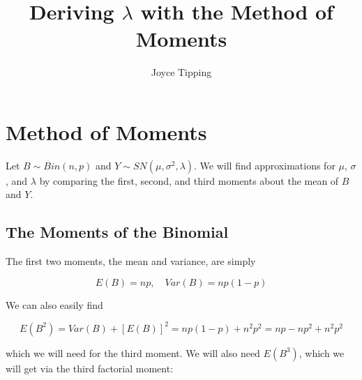 \documentclass{article}
\begin{document}
\title {Deriving $\lambda$ with the Method of Moments}
\author {Joyce Tipping}
\date{}
\maketitle

\section{Method of Moments}

Let $B \sim Bin(n, p)$ and $Y \sim SN(\mu, \sigma^2, \lambda)$. We will find
approximations for $\mu$, $\sigma$, and $\lambda$ by comparing the first,
second, and third moments about the mean of $B$ and $Y$.

\subsection{The Moments of the Binomial}

The first two moments, the mean and variance, are simply

\begin{equation*}
  E(B) = np, \quad Var(B) = np(1-p)
\end{equation*}

We can also easily find

\begin{equation*}
  E(B^2) = Var(B) + [E(B)]^2 = np(1-p) + n^2p^2 = np - np^2 + n^2p^2
\end{equation*}

which we will need for the third moment. We will also need $E(B^3)$, which we
will get via the third factorial moment:
\end{document}
